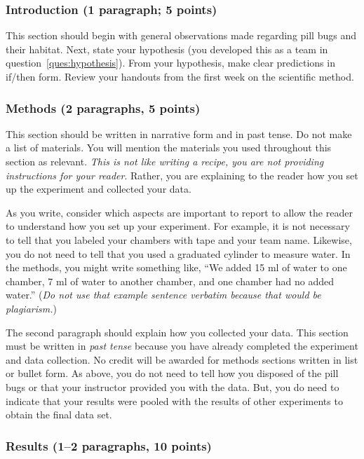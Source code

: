 \documentclass[12pt, hidelinks]{exam}
\begin{document}
 
\subsubsection*{Introduction (1 paragraph; 5 points)} 

This section should begin with general observations made regarding
pill bugs and their habitat. Next, state your hypothesis (you developed this as a team in question~\ref{ques:hypothesis}).
From your hypothesis, make clear predictions in if/then form. Review your handouts from
the first week on the scientific method.


\subsubsection*{Methods (2 paragraphs, 5 points)} 

This section should be written in narrative form and in past tense. Do
not make a list of materials. You will mention the materials you used
throughout this section as relevant. \emph{This is not like writing a
	recipe, you are not providing instructions for your reader}. Rather, you
are explaining to the reader how you set up the experiment and collected
your data.

As you write, consider which aspects are important to report to allow
the reader to understand how you set up your experiment. For example, it
is not necessary to tell that you labeled your chambers with tape and your team name. Likewise, you do not need to tell that you used a graduated cylinder to measure water. In the methods, you might
write something like, ``We added 15 ml of water to one chamber, 7 ml of water to another chamber, and one chamber had no added water.'' (\emph{Do not use that example sentence verbatim because that would be plagiarism.})

The second paragraph should explain how you
collected your data. This section must be written in \emph{past tense} because you have
already completed the experiment and data collection. No credit will be
awarded for methods sections written in list or bullet form. As above, you do not need to tell how you disposed of the pill bugs or that your instructor provided you with the data. But, you do need to indicate that your results were pooled with the results of other experiments to obtain the final data set.

\subsubsection*{Results (1–2 paragraphs, 10 points)}
\end{document}
